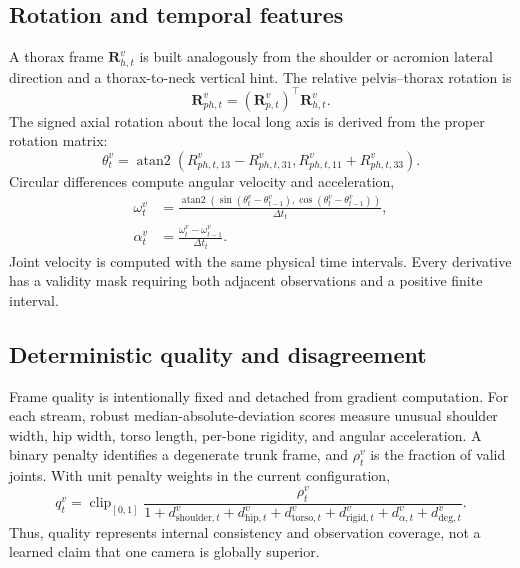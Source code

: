 \subsection{Rotation and temporal features}

A thorax frame $\mathbf{R}^{v}_{h,t}$ is built analogously from the shoulder or
acromion lateral direction and a thorax-to-neck vertical hint. The relative
pelvis--thorax rotation is
\begin{equation}
  \mathbf{R}^{v}_{ph,t}=
  (\mathbf{R}^{v}_{p,t})^{\top}\mathbf{R}^{v}_{h,t}.
\end{equation}
The signed axial rotation about the local long axis is derived from the proper
rotation matrix:
\begin{equation}
  \theta^{v}_{t}=\operatorname{atan2}
  \left(R^{v}_{ph,t,13}-R^{v}_{ph,t,31},
        R^{v}_{ph,t,11}+R^{v}_{ph,t,33}\right).
  \label{eq:theta}
\end{equation}
Circular differences compute angular velocity and acceleration,
\begin{align}
  \omega^{v}_{t} & =
  \frac{\operatorname{atan2}(\sin(\theta^{v}_{t}-\theta^{v}_{t-1}),
  \cos(\theta^{v}_{t}-\theta^{v}_{t-1}))}{\Delta t_t},\\
  \alpha^{v}_{t} & =
  \frac{\omega^{v}_{t}-\omega^{v}_{t-1}}{\Delta t_t}.
\end{align}
Joint velocity is computed with the same physical time intervals. Every
derivative has a validity mask requiring both adjacent observations and a
positive finite interval.

\subsection{Deterministic quality and disagreement}

Frame quality is intentionally fixed and detached from gradient computation.
For each stream, robust median-absolute-deviation scores measure unusual
shoulder width, hip width, torso length, per-bone rigidity, and angular
acceleration. A binary penalty identifies a degenerate trunk frame, and
$\rho^v_t$ is the fraction of valid joints. With unit penalty weights in the
current configuration,
\begin{equation}
 q^v_t=\operatorname{clip}_{[0,1]}
 \frac{\rho^v_t}{1+d^{v}_{\mathrm{shoulder},t}+
 d^{v}_{\mathrm{hip},t}+d^{v}_{\mathrm{torso},t}+
 d^{v}_{\mathrm{rigid},t}+d^{v}_{\alpha,t}+d^{v}_{\mathrm{deg},t}}.
 \label{eq:quality}
\end{equation}
Thus, quality represents internal consistency and observation coverage, not a
learned claim that one camera is globally superior.

